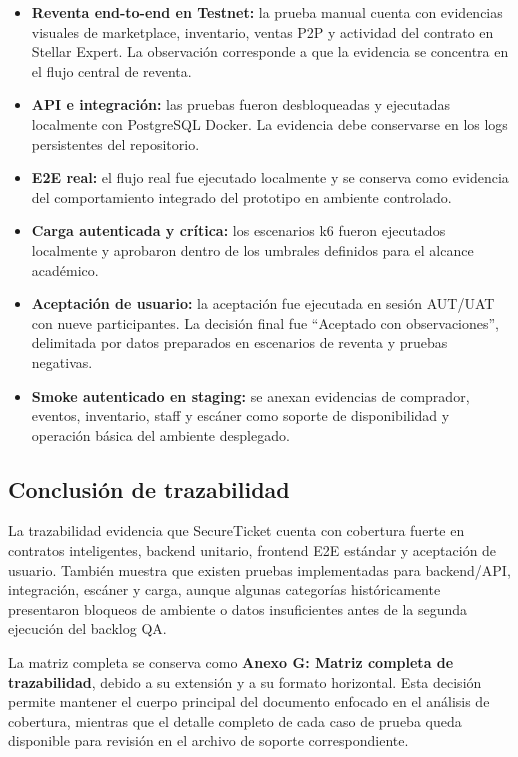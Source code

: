 \documentclass[12pt,letterpaper]{article}
\newcommand{\NombreProyecto}{SecureTicket}
\begin{document}
\begin{itemize}
    \item \textbf{Reventa end-to-end en Testnet:} la prueba manual cuenta con evidencias visuales de marketplace, inventario, ventas P2P y actividad del contrato en Stellar Expert. La observación corresponde a que la evidencia se concentra en el flujo central de reventa.

    \item \textbf{API e integración:} las pruebas fueron desbloqueadas y ejecutadas localmente con PostgreSQL Docker. La evidencia debe conservarse en los logs persistentes del repositorio.

    \item \textbf{E2E real:} el flujo real fue ejecutado localmente y se conserva como evidencia del comportamiento integrado del prototipo en ambiente controlado.

    \item \textbf{Carga autenticada y crítica:} los escenarios k6 fueron ejecutados localmente y aprobaron dentro de los umbrales definidos para el alcance académico.

    \item \textbf{Aceptación de usuario:} la aceptación fue ejecutada en sesión AUT/UAT con nueve participantes. La decisión final fue ``Aceptado con observaciones'', delimitada por datos preparados en escenarios de reventa y pruebas negativas.

    \item \textbf{Smoke autenticado en staging:} se anexan evidencias de comprador, eventos, inventario, staff y escáner como soporte de disponibilidad y operación básica del ambiente desplegado.
\end{itemize}

\subsection{Conclusión de trazabilidad}

La trazabilidad evidencia que \NombreProyecto{} cuenta con cobertura fuerte en contratos inteligentes, backend unitario, frontend E2E estándar y aceptación de usuario. También muestra que existen pruebas implementadas para backend/API, integración, escáner y carga, aunque algunas categorías históricamente presentaron bloqueos de ambiente o datos insuficientes antes de la segunda ejecución del backlog QA.

La matriz completa se conserva como \textbf{Anexo G: Matriz completa de trazabilidad}, debido a su extensión y a su formato horizontal. Esta decisión permite mantener el cuerpo principal del documento enfocado en el análisis de cobertura, mientras que el detalle completo de cada caso de prueba queda disponible para revisión en el archivo de soporte correspondiente.
\end{document}
